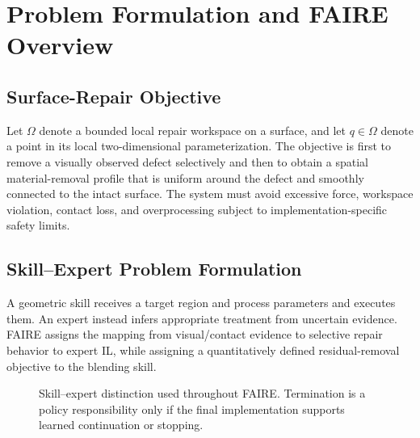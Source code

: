 \chapter{Problem Formulation and FAIRE Overview}
\label{chap:faire_overview}

\section{Surface-Repair Objective}
Let \(\Omega\) denote a bounded local repair workspace on a surface, and let \(q\in\Omega\) denote a point in its local two-dimensional parameterization. The objective is first to remove a visually observed defect selectively and then to obtain a spatial material-removal profile that is uniform around the defect and smoothly connected to the intact surface. The system must avoid excessive force, workspace violation, contact loss, and overprocessing subject to implementation-specific safety limits.

\section{Skill--Expert Problem Formulation}
A geometric skill receives a target region and process parameters and executes them. An expert instead infers appropriate treatment from uncertain evidence. FAIRE assigns the mapping from visual/contact evidence to selective repair behavior to expert IL, while assigning a quantitatively defined residual-removal objective to the blending skill.

\begin{figure}[t]
  \centering
  \caption{Skill--expert distinction used throughout FAIRE. Termination is a policy responsibility only if the final implementation supports learned continuation or stopping.}
  \label{fig:skill_expert}
\end{figure}

